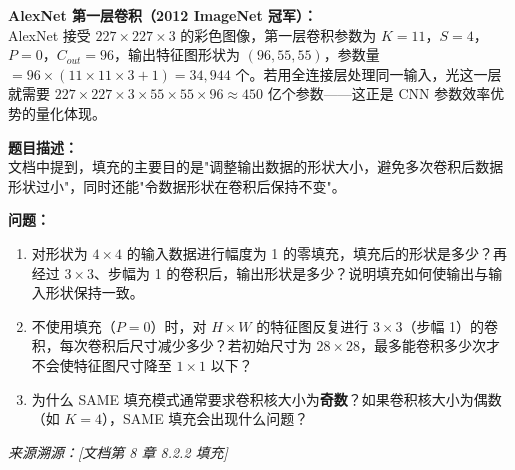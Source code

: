 \documentclass[a4paper,11pt]{ctexart}
\begin{document}
\begin{appbox}[现实应用场景]
    \textbf{AlexNet 第一层卷积（2012 ImageNet 冠军）：}\\
    AlexNet 接受 $227 \times 227 \times 3$ 的彩色图像，第一层卷积参数为 $K=11$，$S=4$，$P=0$，$C_{out}=96$，输出特征图形状为 $(96, 55, 55)$，参数量 $= 96 \times (11 \times 11 \times 3 + 1) = 34{,}944$ 个。若用全连接层处理同一输入，光这一层就需要 $227 \times 227 \times 3 \times 55 \times 55 \times 96 \approx 450$ 亿个参数——这正是 CNN 参数效率优势的量化体现。
\end{appbox}


\begin{problembox}
    \textbf{题目描述：}\\
    文档中提到，填充的主要目的是"调整输出数据的形状大小，避免多次卷积后数据形状过小"，同时还能"令数据形状在卷积后保持不变"。

    \vspace{0.2cm}
    \textbf{问题：}
    \begin{enumerate}[(1)]
        \item 对形状为 $4 \times 4$ 的输入数据进行幅度为 1 的零填充，填充后的形状是多少？再经过 $3 \times 3$、步幅为 1 的卷积后，输出形状是多少？说明填充如何使输出与输入形状保持一致。
        \item 不使用填充（$P=0$）时，对 $H \times W$ 的特征图反复进行 $3 \times 3$（步幅 1）的卷积，每次卷积后尺寸减少多少？若初始尺寸为 $28 \times 28$，最多能卷积多少次才不会使特征图尺寸降至 $1 \times 1$ 以下？
        \item 为什么 SAME 填充模式通常要求卷积核大小为\textbf{奇数}？如果卷积核大小为偶数（如 $K=4$），SAME 填充会出现什么问题？
    \end{enumerate}

    \vspace{0.2cm}
    {\color{gray}\small\textit{来源溯源：[文档第 8 章 8.2.2 填充]}}
\end{problembox}
\end{document}
